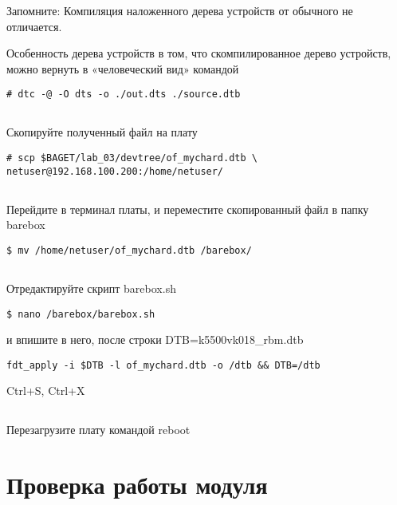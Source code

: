 \begin{Notes}{Запомните:}
	Компиляция наложенного дерева устройств от обычного не отличается. 
\end{Notes}

\vspace{5mm}
Особенность дерева устройств в том, что скомпилированное дерево устройств, можно вернуть в «человеческий вид» командой 
\begin{lstlisting}[style=bash]
# dtc -@ -O dts -o ./out.dts ./source.dtb
\end{lstlisting}

\subsection{}Скопируйте полученный файл на плату
\begin{lstlisting}[style=bash]
# scp $BAGET/lab_03/devtree/of_mychard.dtb \
netuser@192.168.100.200:/home/netuser/
\end{lstlisting}

\subsection{}Перейдите в терминал платы, и переместите скопированный файл в папку barebox
\begin{lstlisting}[style=bash]
$ mv /home/netuser/of_mychard.dtb /barebox/
\end{lstlisting}

\subsection{}Отредактируйте скрипт barebox.sh
\begin{lstlisting}[style=bash]
$ nano /barebox/barebox.sh
\end{lstlisting}
и впишите в него, после строки DTB=k5500vk018\_rbm.dtb
\begin{lstlisting}[style=stdout]
fdt_apply -i $DTB -l of_mychard.dtb -o /dtb && DTB=/dtb
\end{lstlisting}
Ctrl+S, Ctrl+X 

\subsection{}Перезагрузите плату командой reboot

\section{Проверка работы модуля}


